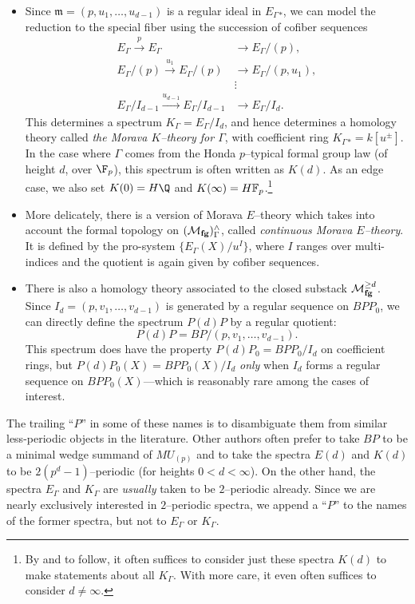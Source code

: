 \begin{definition}
\begin{itemize}
\item Since \(\mathfrak m = (p, u_1, \ldots, u_{d-1})\) is a regular ideal in \(E_\Gamma{}_*\), we can model the reduction to the special fiber using the succession of cofiber sequences
\begin{align*}
E_\Gamma \xrightarrow{p} E_\Gamma & \to E_\Gamma / (p), \\
E_\Gamma / (p) \xrightarrow{u_1} E_\Gamma / (p) & \to E_\Gamma / (p, u_1), \\
& \vdots \\
E_\Gamma / I_{d-1} \xrightarrow{u_{d-1}} E_\Gamma / I_{d-1} & \to E_\Gamma / I_d.
\end{align*}
This determines a spectrum \(K_\Gamma = E_\Gamma / I_d\), and hence determines a homology theory called \textit{the Morava \(K\)--theory for \(\Gamma\)}, with coefficient ring $K_\Gamma{}_* = k[u^\pm]$.  In the case where \(\Gamma\) comes from the Honda \(p\)--typical formal group law (of height \(d\), over \(\F_p\)), this spectrum is often written as \(K(d)\).  As an edge case, we also set \(K(0) = H\Q\) and \(K(\infty) = \HFp\).\footnote{By  and  to follow, it often suffices to consider just these spectra \(K(d)\) to make statements about all \(K_\Gamma\).  With more care, it even often suffices to consider \(d \ne \infty\).}
\item More delicately, there is a version of Morava \(E\)--theory which takes into account the formal topology on \((\mathcal{M}_{\mathbf{fg}})^\wedge_\Gamma\), called \index{}\textit{continuous Morava \(E\)--theory}.  It is defined by the pro-system \(\{E_\Gamma(X) / u^I\}\), where \(I\) ranges over multi-indices and the quotient is again given by cofiber sequences.
\item There is also a homology theory associated to the closed substack \(\mathcal{M}_{\mathbf{fg}}^{\ge d}\).  Since \(I_d = (p, v_1, \ldots, v_{d-1})\) is generated by a regular sequence on \(BPP_0\), we can directly define the spectrum \(P(d)P\) by a regular quotient: \[P(d)P = BP / (p, v_1, \ldots, v_{d-1}).\]  This spectrum does have the property \(P(d)P_0 = BPP_0 / I_d\) on coefficient rings, but \(P(d)P_0(X) = BPP_0(X) / I_d\) \emph{only} when \(I_d\) forms a regular sequence on \(BPP_0(X)\)---which is reasonably rare among the cases of interest.
\end{itemize}
\end{definition}

\begin{remark}
The trailing ``\(P\)'' in some of these names is to disambiguate them from similar less-periodic objects in the literature.  Other authors often prefer to take \(BP\) to be a minimal wedge summand of \(MU_{(p)}\) and to take the spectra \(E(d)\) and \(K(d)\) to be \(2(p^d-1)\)--periodic (for heights \(0 < d < \infty\)).  On the other hand, the spectra \(E_\Gamma\) and \(K_\Gamma\) are \emph{usually} taken to be \(2\)--periodic already.  Since we are nearly exclusively interested in \(2\)--periodic spectra, we append a ``\(P\)'' to the names of the former spectra, but not to \(E_\Gamma\) or \(K_\Gamma\).
\end{remark}

